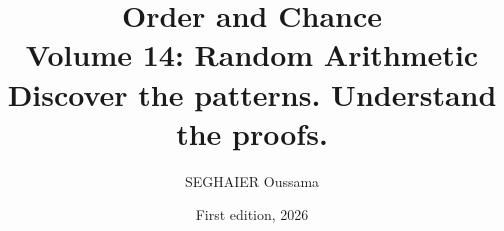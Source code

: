 \documentclass[11pt,openany]{book}
\title{\Huge\textbf{Order and Chance}\\[0.4em]\LARGE Volume 14: Random Arithmetic\\[0.6em]
\Large Discover the patterns. Understand the proofs.}
\author{SEGHAIER Oussama}
\date{First edition, 2026}
\begin{document}
\frontmatter
\makecover
\maketitle

\tableofcontents

\mainmatter














\end{document}
